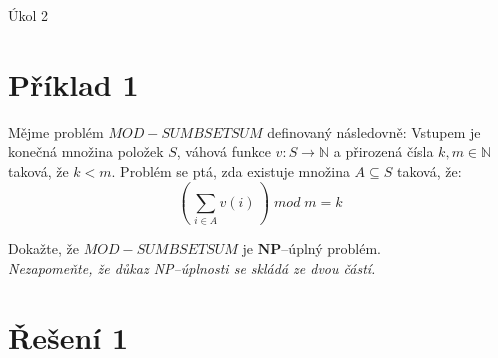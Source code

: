 \documentclass[a4paper, 11pt, fleqn]{scrartcl}
\newcommand{\NAZEV}{Úkol 2}
\begin{document}
 \begin{center}
   {\Large \NAZEV}
 \end{center}


 \section*{Příklad 1}
  Mějme problém $\mathit{MOD-SUMBSETSUM}$ definovaný následovně: Vstupem je konečná množina položek $S$, váhová funkce $v : S \rightarrow \mathbb{N}$ a přirozená čísla $k, m \in \mathbb{N}$ taková, že $k < m$. Problém se ptá, zda existuje množina $A \subseteq S$ taková, že:
  $$ \left(\, \sum_{i \in A}v(i)\,\right)\; mod\; m = k $$

  \vspace{0.2cm}
  Dokažte, že $\mathit{MOD-SUMBSETSUM}$ je $\mathbf{NP}$--úplný problém.\\
  \textit{Nezapomeňte, že důkaz NP--úplnosti se skládá ze dvou částí.}

 \section*{Řešení 1}
\end{document}
